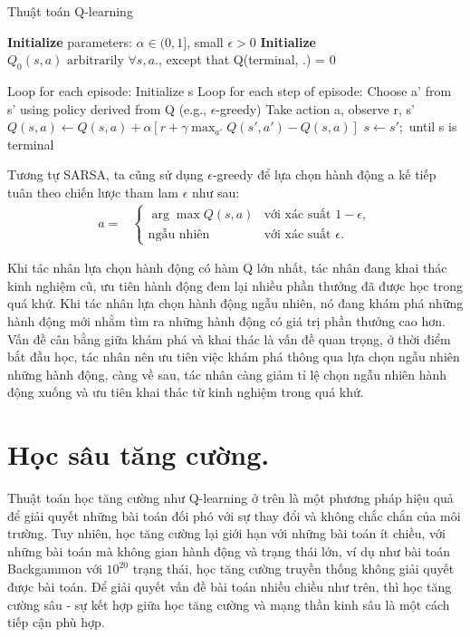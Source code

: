 \documentclass{uetgraduation}
\begin{document}
\begin{algorithm}
    \caption{Thuật toán Q-learning}\label{alg:q_learning}
    \begin{algorithmic}[1]
    \State \textbf{Initialize } parameters: $\alpha \in (0, 1]$, small $\epsilon > 0$
    \State \textbf{Initialize } $Q_0(s,a) \text{ arbitrarily } \forall s,a.$, except that Q(terminal, .) = 0
    
    \State Loop for each episode:
        \State \quad Initialize s
        \State \quad Loop for each step of episode:
            \State \quad \quad Choose a' from s' using policy derived from Q (e.g., $\epsilon$-greedy)
            \State \quad \quad Take action a, observe r, s'
            \State \quad \quad $Q(s, a) \leftarrow Q(s, a) + \alpha [r + \gamma \max_{a'} Q (s', a') - Q(s, a)]$
            \State \quad \quad $s \leftarrow s';$
        \State \quad until s is terminal
\end{algorithmic}
\end{algorithm}

Tương tự SARSA, ta cũng sử dụng $\epsilon$-greedy để lựa chọn hành động a kế tiếp tuân theo chiến lược tham lam $\epsilon$ như sau:
\begin{align*}
    a =& \begin{cases}
        \arg \max Q(s, a) & \text{với xác suất } 1 - \epsilon, \\ 
        \text{ngẫu nhiên} & \text{với xác suất } \epsilon.
    \end{cases}
\end{align*}

Khi tác nhân lựa chọn hành động có hàm Q lớn nhất, tác nhân đang khai thác kinh nghiệm cũ, ưu tiên hành động đem lại nhiều phần thưởng đã được học trong quá khứ.
Khi tác nhân lựa chọn hành động ngẫu nhiên, nó đang khám phá những hành động mới nhằm tìm ra những hành động có giá trị phần thưởng cao hơn. Vấn đề cân bằng giữa khám phá và khai thác là
vấn đề quan trọng, ở thời điểm bắt đầu học, tác nhân nên ưu tiên việc khám phá thông qua lựa chọn ngẫu nhiên những hành động, càng về sau, tác nhân càng giảm tỉ lệ chọn ngẫu nhiên hành
động xuống và ưu tiên khai thác từ kinh nghiệm trong quá khứ.

\section{Học sâu tăng cường.}
Thuật toán học tăng cường như Q-learning ở trên là một phương pháp hiệu quả để giải quyết những bài toán đối phó với sự thay đổi và không chắc chắn của môi trường. Tuy nhiên, học tăng cường
lại giới hạn với những bài toán ít chiều, với những bài toán mà không gian hành động và trạng thái lớn, ví dụ như bài toán Backgammon với $10^{20}$ trạng thái, học tăng cường truyền thống 
không giải quyết
được bài toán. Để giải quyết vấn đề bài toán nhiều chiều như trên, thì học tăng cường sâu - sự kết hợp giữa học tăng cường và mạng thần kinh sâu là một cách tiếp cận phù hợp.
\end{document}
